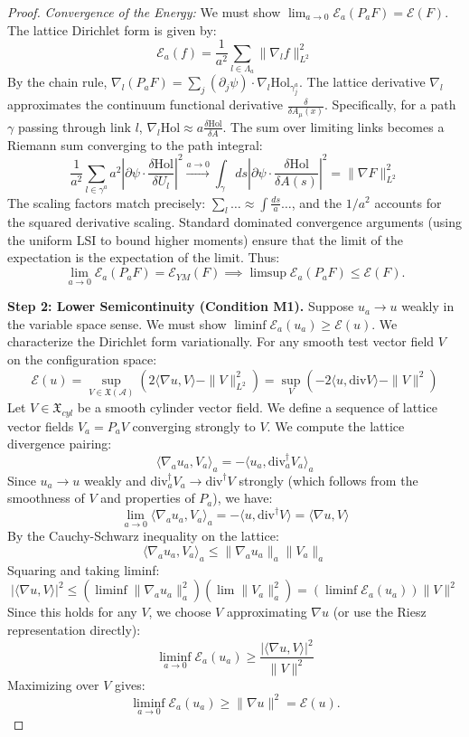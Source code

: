 \begin{proof}
    \textit{Convergence of the Energy:}
    We must show $\lim_{a \to 0} \mathcal{E}_a(P_a F) = \mathcal{E}(F)$.
    The lattice Dirichlet form is given by:
    \[ \mathcal{E}_a(f) = \frac{1}{a^2} \sum_{l \in \Lambda_a} \| \nabla_l f \|_{L^2}^2 \]
    By the chain rule, $\nabla_l (P_a F) = \sum_j (\partial_j \psi) \cdot \nabla_l \mathrm{Hol}_{\gamma_j^a}$.
    The lattice derivative $\nabla_l$ approximates the continuum functional derivative $\frac{\delta}{\delta A_\mu(x)}$. Specifically, for a path $\gamma$ passing through link $l$, $\nabla_l \mathrm{Hol} \approx a \frac{\delta \mathrm{Hol}}{\delta A}$.
    The sum over limiting links becomes a Riemann sum converging to the path integral:
    \[ \frac{1}{a^2} \sum_{l \in \gamma^a} a^2 \left| \partial \psi \cdot \frac{\delta \mathrm{Hol}}{\delta U_l} \right|^2 \xrightarrow{a \to 0} \int_\gamma ds \left| \partial \psi \cdot \frac{\delta \mathrm{Hol}}{\delta A(s)} \right|^2 = \|\nabla F\|_{L^2}^2 \]
    The scaling factors match precisely: $\sum_{l} \dots \approx \int \frac{ds}{a} \dots$, and the $1/a^2$ accounts for the squared derivative scaling.
    Standard dominated convergence arguments (using the uniform LSI to bound higher moments) ensure that the limit of the expectation is the expectation of the limit. Thus:
    \[ \lim_{a \to 0} \mathcal{E}_a(P_a F) = \mathcal{E}_{YM}(F) \implies \limsup \mathcal{E}_a(P_a F) \le \mathcal{E}(F). \]
    
    \textbf{Step 2: Lower Semicontinuity (Condition M1).}
    Suppose $u_a \to u$ weakly in the variable space sense. We must show $\liminf \mathcal{E}_a(u_a) \ge \mathcal{E}(u)$.
    We characterize the Dirichlet form variationally. For any smooth test vector field $V$ on the configuration space:
    \[ \mathcal{E}(u) = \sup_{V \in \mathfrak{X}(\mathcal{A})} \left( 2 \langle \nabla u, V \rangle - \|V\|^2_{L^2} \right) = \sup_{V} \left( -2 \langle u, \text{div} V \rangle - \|V\|^2 \right) \]
    Let $V \in \mathfrak{X}_{cyl}$ be a smooth cylinder vector field. We define a sequence of lattice vector fields $V_a = P_a V$ converging strongly to $V$.
    We compute the lattice divergence pairing:
    \[ \langle \nabla_a u_a, V_a \rangle_a = - \langle u_a, \text{div}_a^\dagger V_a \rangle_a \]
    Since $u_a \to u$ weakly and $\text{div}_a^\dagger V_a \to \text{div}^\dagger V$ strongly (which follows from the smoothness of $V$ and properties of $P_a$), we have:
    \[ \lim_{a \to 0} \langle \nabla_a u_a, V_a \rangle_a = - \langle u, \text{div}^\dagger V \rangle = \langle \nabla u, V \rangle \]
    By the Cauchy-Schwarz inequality on the lattice:
    \[ \langle \nabla_a u_a, V_a \rangle_a \le \|\nabla_a u_a\|_a \|V_a\|_a \]
    Squaring and taking liminf:
    \[ |\langle \nabla u, V \rangle|^2 \le (\liminf \|\nabla_a u_a\|_a^2) (\lim \|V_a\|_a^2) = (\liminf \mathcal{E}_a(u_a)) \|V\|^2 \]
    Since this holds for any $V$, we choose $V$ approximating $\nabla u$ (or use the Riesz representation directly):
    \[ \liminf_{a \to 0} \mathcal{E}_a(u_a) \ge \frac{|\langle \nabla u, V \rangle|^2}{\|V\|^2} \]
    Maximizing over $V$ gives:
    \[ \liminf_{a \to 0} \mathcal{E}_a(u_a) \ge \|\nabla u\|^2 = \mathcal{E}(u). \]
    

\end{proof}
